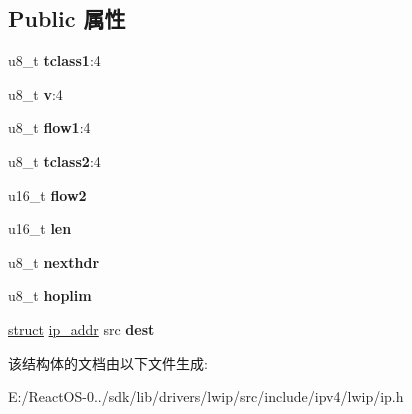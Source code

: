 \subsection*{Public 属性}
\begin{DoxyCompactItemize}
\item 
\mbox{\label{structip__hdr_aff59fbc114853a1d9bc44da83c04765e}} 
u8\+\_\+t {\bfseries tclass1}\+:4
\item 
\mbox{\label{structip__hdr_a3066d68a8a36f1de8c79db2f5b67e425}} 
u8\+\_\+t {\bfseries v}\+:4
\item 
\mbox{\label{structip__hdr_a4c540b15f84a9ee0290f277f896b913c}} 
u8\+\_\+t {\bfseries flow1}\+:4
\item 
\mbox{\label{structip__hdr_af40d1bf6005169510fb0c4910abe0ecf}} 
u8\+\_\+t {\bfseries tclass2}\+:4
\item 
\mbox{\label{structip__hdr_acb46c4fbc7cabb2da0c328a712ff8ff3}} 
u16\+\_\+t {\bfseries flow2}
\item 
\mbox{\label{structip__hdr_a53f3a7eb476a9667f23f1edbc0b94aca}} 
u16\+\_\+t {\bfseries len}
\item 
\mbox{\label{structip__hdr_ae659b31431947366639063f917b1864b}} 
u8\+\_\+t {\bfseries nexthdr}
\item 
\mbox{\label{structip__hdr_ac6ac97fa9cc364ca7cc9f0ae3713567c}} 
u8\+\_\+t {\bfseries hoplim}
\item 
\mbox{\label{structip__hdr_a815e233e57dabbb88731c7454498286c}} 
\hyperlink{interfacestruct}{struct} \hyperlink{structip__addr}{ip\+\_\+addr} src {\bfseries dest}
\end{DoxyCompactItemize}


该结构体的文档由以下文件生成\+:\begin{DoxyCompactItemize}
\item 
E\+:/\+React\+O\+S-\/0../sdk/lib/drivers/lwip/src/include/ipv4/lwip/ip.\+h\end{DoxyCompactItemize}
